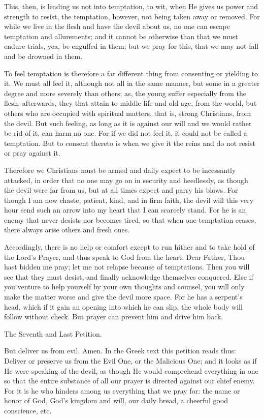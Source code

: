 This, then, is leading us not into temptation, to wit, when He gives us
power and strength to resist, the temptation, however, not being taken
away or removed. For while we live in the flesh and have the devil
about us, no one can escape temptation and allurements; and it cannot
be otherwise than that we must endure trials, yea, be engulfed in them;
but we pray for this, that we may not fall and be drowned in them.

To feel temptation is therefore a far different thing from consenting
or yielding to it. We must all feel it, although not all in the same
manner, but some in a greater degree and more severely than others; as,
the young suffer especially from the flesh, afterwards, they that
attain to middle life and old age, from the world, but others who are
occupied with spiritual matters, that is, strong Christians, from the
devil. But such feeling, as long as it is against our will and we would
rather be rid of it, can harm no one. For if we did not feel it, it
could not be called a temptation. But to consent thereto is when we
give it the reins and do not resist or pray against it.

Therefore we Christians must be armed and daily expect to be
incessantly attacked, in order that no one may go on in security and
heedlessly, as though the devil were far from us, but at all times
expect and parry his blows. For though I am now chaste, patient, kind,
and in firm faith, the devil will this very hour send such an arrow
into my heart that I can scarcely stand. For he is an enemy that never
desists nor becomes tired, so that when one temptation ceases, there
always arise others and fresh ones.

Accordingly, there is no help or comfort except to run hither and to
take hold of the Lord's Prayer, and thus speak to God from the heart:
Dear Father, Thou hast bidden me pray; let me not relapse because of
temptations. Then you will see that they must desist, and finally
acknowledge themselves conquered. Else if you venture to help yourself
by your own thoughts and counsel, you will only make the matter worse
and give the devil more space. For he has a serpent's head, which if it
gain an opening into which he can slip, the whole body will follow
without check. But prayer can prevent him and drive him back.

The Seventh and Last Petition.

But deliver us from evil. Amen. In the Greek text this petition reads
thus: Deliver or preserve us from the Evil One, or the Malicious One;
and it looks as if He were speaking of the devil, as though He would
comprehend everything in one so that the entire substance of all our
prayer is directed against our chief enemy. For it is he who hinders
among us everything that we pray for: the name or honor of God, God's
kingdom and will, our daily bread, a cheerful good conscience, etc.


